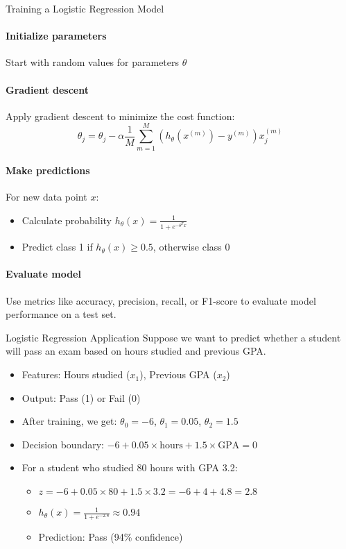 \begin{KR}{Training a Logistic Regression Model}
\paragraph{Initialize parameters}
Start with random values for parameters $\theta$

\paragraph{Gradient descent}
Apply gradient descent to minimize the cost function:
\[\theta_j = \theta_j - \alpha \frac{1}{M}\sum_{m=1}^{M}(h_\theta(x^{(m)}) - y^{(m)})x^{(m)}_j\]

\paragraph{Make predictions}
For new data point $x$:
\begin{itemize}
    \item Calculate probability $h_\theta(x) = \frac{1}{1 + e^{-\theta^T x}}$
    \item Predict class 1 if $h_\theta(x) \geq 0.5$, otherwise class 0
\end{itemize}

\paragraph{Evaluate model}
Use metrics like accuracy, precision, recall, or F1-score to evaluate model performance on a test set.
\end{KR}

\begin{example}{Logistic Regression Application}
Suppose we want to predict whether a student will pass an exam based on hours studied and previous GPA.
\begin{itemize}
    \item Features: Hours studied ($x_1$), Previous GPA ($x_2$)
    \item Output: Pass (1) or Fail (0)
    \item After training, we get: $\theta_0 = -6$, $\theta_1 = 0.05$, $\theta_2 = 1.5$
    \item Decision boundary: $-6 + 0.05 \times \text{hours} + 1.5 \times \text{GPA} = 0$
    \item For a student who studied 80 hours with GPA 3.2:
    \begin{itemize}
        \item $z = -6 + 0.05 \times 80 + 1.5 \times 3.2 = -6 + 4 + 4.8 = 2.8$
        \item $h_\theta(x) = \frac{1}{1 + e^{-2.8}} \approx 0.94$
        \item Prediction: Pass (94\% confidence)
    \end{itemize}
\end{itemize}
\end{example}


